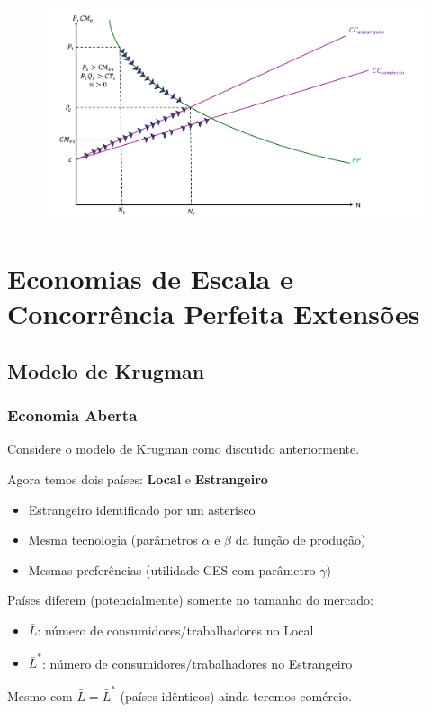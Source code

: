 \documentclass[a4paper,12pt]{article}[abntex2]
\begin{document}
\begin{figure}[H]
    \centering
    \includegraphics[width=0.7\linewidth]{Imagens/a17i1.png}
\end{figure}

\newpage
\section{\textbf{Economias de Escala e Concorrência Perfeita Extensões}}
\subsection{\textbf{Modelo de Krugman}}
\subsubsection{\textbf{Economia Aberta}}
Considere o modelo de Krugman como discutido anteriormente.

Agora temos dois países: \textbf{Local} e \textbf{Estrangeiro}

\begin{itemize}
    \item Estrangeiro identificado por um asterisco
    \item Mesma tecnologia (parâmetros \(\alpha\) e \(\beta\) da função de produção)
    \item Mesmas preferências (utilidade CES com parâmetro \(\gamma\))
\end{itemize}

Países diferem (potencialmente) somente no tamanho do mercado:
\begin{itemize}
    \item \(\bar{L}\): número de consumidores/trabalhadores no Local
    \item \(\bar{L}^*\): número de consumidores/trabalhadores no Estrangeiro
\end{itemize}

Mesmo com \(\bar{L} = \bar{L}^*\) (países idênticos) ainda teremos comércio.
\end{document}
